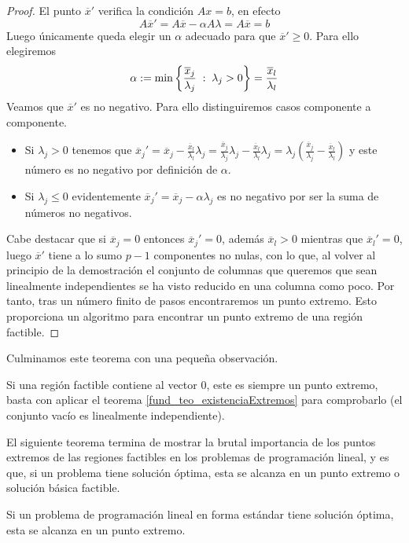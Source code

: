 \begin{proof}
	El punto $\overline{x}'$ verifica la condición $Ax=b$, en efecto
	\begin{equation*}
		A\overline{x}'=A\overline{x}-\alpha A\lambda=A\overline{x}=b
	\end{equation*}
	Luego únicamente queda elegir un $\alpha$ adecuado para que $\overline{x}'\geq 0$. Para ello elegiremos
	\begin{equation*}
		\alpha:=\min\left\{\frac{\overline{x}_j}{\lambda_j}\;:\; \lambda_j>0\right\}=\frac{\overline{x}_l}{\lambda_l}
	\end{equation*}
	Veamos que $\overline{x}'$ es no negativo. Para ello distinguiremos casos componente a componente.
	\begin{itemize}
		\item Si $\lambda_j > 0$ tenemos que $\overline{x}_j'=\overline{x}_j-\frac{\overline{x}_l}{\lambda_l}\lambda_j=\frac{\overline{x}_j}{\lambda_j}\lambda_j-\frac{\overline{x}_l}{\lambda_l}\lambda_j=\lambda_j\left(\frac{\overline{x}_j}{\lambda_j}-\frac{\overline{x}_l}{\lambda_l}\right)$ y este número es no negativo por definición de $\alpha$.
		\item Si $\lambda_j\leq 0$ evidentemente $\overline{x}_j'=\overline{x}_j-\alpha\lambda_j$ es no negativo por ser la suma de números no negativos.
	\end{itemize}
	Cabe destacar que si $\overline{x}_j=0$ entonces $\overline{x}_j'=0$, además $\overline{x}_l>0$ mientras que $\overline{x}_l'=0$, luego $\overline{x}'$ tiene a lo sumo $p-1$ componentes no nulas, con lo que, al volver al principio de la demostración el conjunto de columnas que queremos que sean linealmente independientes se ha visto reducido en una columna como poco. Por tanto, tras un número finito de pasos encontraremos un punto extremo. Esto proporciona un algoritmo para encontrar un punto extremo de una región factible.
\end{proof}
Culminamos este teorema con una pequeña observación.
\begin{obs}
	Si una región factible contiene al vector $0$, este es siempre un punto extremo, basta con aplicar el teorema \ref{fund_teo_existenciaExtremos} para comprobarlo (el conjunto vacío es linealmente independiente). 
\end{obs}
El siguiente teorema termina de mostrar la brutal importancia de los puntos extremos de las regiones factibles en los problemas de programación lineal, y es que, si un problema tiene solución óptima, esta se alcanza en un punto extremo o solución básica factible.
\begin{theo}[Optimalidad]
	Si un problema de programación lineal en forma estándar tiene solución óptima, esta se alcanza en un punto extremo.
\end{theo}
